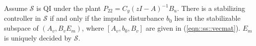 \begin{thm}\label{thm::genfea}
Assume \(\mathcal{S}\) is QI under the plant \(P_{22} = C_y(zI -A)^{-1}B_u\).
There is a stabilizing controller in \(\mathcal{S}\) if and only if the impulse disturbance \(b_0\) lies in the stabilizable subspace of \((A_v,B_v E_m)\), where \([A_v, b_0, B_v]\) are given in (\ref{eqn::ss::vecmat}).
\(E_m\) is uniquely decided by \(\mathcal{S}\).
\end{thm}

